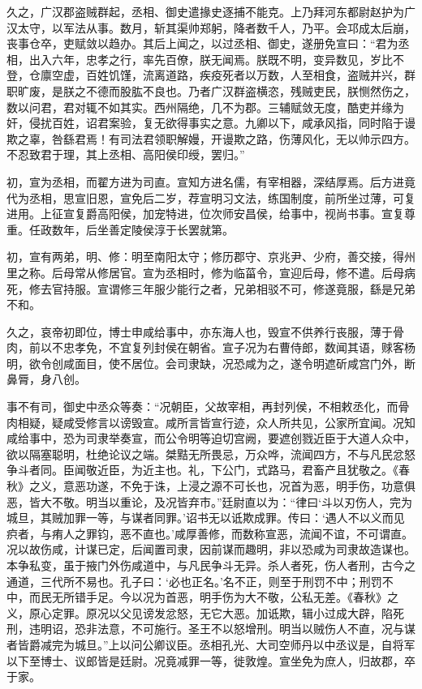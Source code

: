\documentclass[12pt,UTF8]{ctexbook}
\begin{document}
久之，广汉郡盗贼群起，丞相、御史遣掾史逐捕不能克。上乃拜河东都尉赵护为广汉太守，以军法从事。数月，斩其渠帅郑躬，降者数千人，乃平。会邛成太后崩，丧事仓卒，吏赋敛以趋办。其后上闻之，以过丞相、御史，遂册免宣曰：“君为丞相，出入六年，忠孝之行，率先百僚，朕无闻焉。朕既不明，变异数见，岁比不登，仓廪空虚，百姓饥馑，流离道路，疾疫死者以万数，人至相食，盗贼并兴，群职旷废，是朕之不德而股肱不良也。乃者广汉群盗横恣，残贼吏民，朕恻然伤之，数以问君，君对辄不如其实。西州隔绝，几不为郡。三辅赋敛无度，酷吏并缘为奸，侵扰百姓，诏君案验，复无欲得事实之意。九卿以下，咸承风指，同时陷于谩欺之辜，咎繇君焉！有司法君领职解嫚，开谩欺之路，伤薄风化，无以帅示四方。不忍致君于理，其上丞相、高阳侯印绶，罢归。”



初，宣为丞相，而翟方进为司直。宣知方进名儒，有宰相器，深结厚焉。后方进竟代为丞相，思宣旧恩，宣免后二岁，荐宣明习文法，练国制度，前所坐过薄，可复进用。上征宣复爵高阳侯，加宠特进，位次师安昌侯，给事中，视尚书事。宣复尊重。任政数年，后坐善定陵侯淳于长罢就第。



初，宣有两弟，明、修：明至南阳太守；修历郡守、京兆尹、少府，善交接，得州里之称。后母常从修居官。宣为丞相时，修为临菑令，宣迎后母，修不遣。后母病死，修去官持服。宣谓修三年服少能行之者，兄弟相驳不可，修遂竟服，繇是兄弟不和。



久之，哀帝初即位，博士申咸给事中，亦东海人也，毁宣不供养行丧服，薄于骨肉，前以不忠孝免，不宜复列封侯在朝省。宣子况为右曹侍郎，数闻其语，赇客杨明，欲令创咸面目，使不居位。会司隶缺，况恐咸为之，遂令明遮斫咸宫门外，断鼻脣，身八创。



事不有司，御史中丞众等奏：“况朝臣，父故宰相，再封列侯，不相敕丞化，而骨肉相疑，疑咸受修言以谤毁宣。咸所言皆宣行迹，众人所共见，公家所宜闻。况知咸给事中，恐为司隶举奏宣，而公令明等迫切宫阙，要遮创戮近臣于大道人众中，欲以隔塞聪明，杜绝论议之端。桀黠无所畏忌，万众哗，流闻四方，不与凡民忿怒争斗者同。臣闻敬近臣，为近主也。礼，下公门，式路马，君畜产且犹敬之。《春秋》之义，意恶功遂，不免于诛，上浸之源不可长也，况首为恶，明手伤，功意俱恶，皆大不敬。明当以重论，及况皆弃市。”廷尉直以为：“律曰‘斗以刃伤人，完为城旦，其贼加罪一等，与谋者同罪。’诏书无以诋欺成罪。传曰：‘遇人不以义而见疻者，与痏人之罪钧，恶不直也。’咸厚善修，而数称宣恶，流闻不谊，不可谓直。况以故伤咸，计谋已定，后闻置司隶，因前谋而趣明，非以恐咸为司隶故造谋也。本争私变，虽于掖门外伤咸道中，与凡民争斗无异。杀人者死，伤人者刑，古今之通道，三代所不易也。孔子曰：‘必也正名。’名不正，则至于刑罚不中；刑罚不中，而民无所错手足。今以况为首恶，明手伤为大不敬，公私无差。《春秋》之义，原心定罪。原况以父见谤发忿怒，无它大恶。加诋欺，辑小过成大辟，陷死刑，违明诏，恐非法意，不可施行。圣王不以怒增刑。明当以贼伤人不直，况与谋者皆爵减完为城旦。”上以问公卿议臣。丞相孔光、大司空师丹以中丞议是，自将军以下至博士、议郎皆是廷尉。况竟减罪一等，徙敦煌。宣坐免为庶人，归故郡，卒于家。
\end{document}
